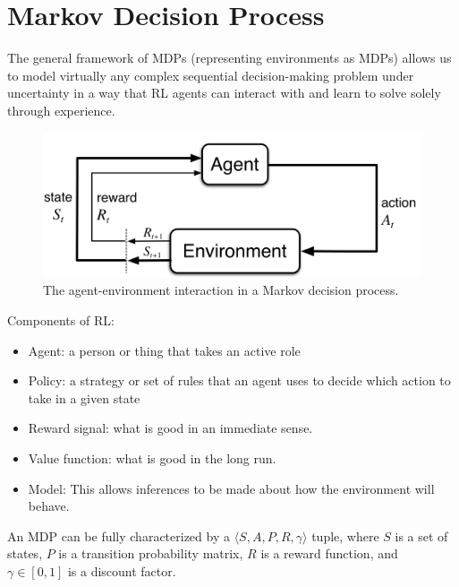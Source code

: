 


\section{Markov Decision Process}

The general framework of MDPs (representing environments as MDPs) allows us to model virtually any complex sequential decision-making problem under uncertainty in a way that RL agents can interact with and learn to solve solely through experience. 

\begin{figure}[h]
	\centering
	\includegraphics[scale=0.3]{./images/mdp.png}
	\caption{The agent-environment interaction in a Markov decision process.}
	\label{fig:mdp_ill}
\end{figure}

Components of RL:
\begin{itemize}
	\item Agent: a person or thing that takes an active role
	\item Policy: a strategy or set of rules that an agent uses to decide which action to take in a given state
	\item Reward signal: what is good in an immediate sense.
	\item Value function: what is good in the long run.
	\item Model: This allows inferences to be made about how the environment will behave.
\end{itemize}
An MDP can be fully characterized by a $\langle S,A,P,R,\gamma \rangle$ tuple, where $S$ is a set of states, $P$ is a transition probability matrix, $R$ is a reward function, and $\gamma\in[0,1]$  is a discount factor.

